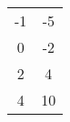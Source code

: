 \documentclass{article}%
\begin{document}
\begin{multicols}{2}
\begin{enumerate}[label=\arabic*),start=1]
{\begin{minipage}{\linewidth}
\begin{tabular}{ | c | c |}
        -1 & -5 \\
    
        0 & -2 \\
    
        2 & 4 \\
    
        4 & 10 \\
    
    \hline
    \end{tabular}
\end{minipage}}%
\vspace{6cm}%
\end{enumerate}

%
\end{multicols}%
\end{document}
